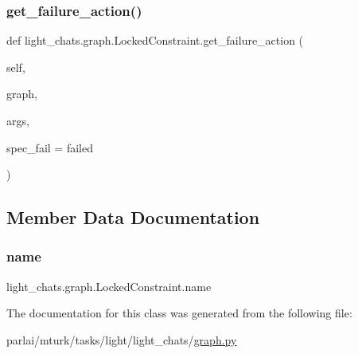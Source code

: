 \subsubsection{\texorpdfstring{get\+\_\+failure\+\_\+action()}{get\_failure\_action()}}
{\footnotesize\ttfamily def light\+\_\+chats.\+graph.\+Locked\+Constraint.\+get\+\_\+failure\+\_\+action (\begin{DoxyParamCaption}\item[{}]{self,  }\item[{}]{graph,  }\item[{}]{args,  }\item[{}]{spec\+\_\+fail = {\ttfamily \textquotesingle{}failed\textquotesingle{}} }\end{DoxyParamCaption})}



\subsection{Member Data Documentation}
\mbox{\label{classlight__chats_1_1graph_1_1LockedConstraint_a3eb1d8b9659eb4aceae729d6a7e2d9f4}} 
\subsubsection{\texorpdfstring{name}{name}}
{\footnotesize\ttfamily light\+\_\+chats.\+graph.\+Locked\+Constraint.\+name\hspace{0.3cm}{\ttfamily [static]}}



The documentation for this class was generated from the following file\+:\begin{DoxyCompactItemize}
\item 
parlai/mturk/tasks/light/light\+\_\+chats/\hyperlink{parlai_2mturk_2tasks_2light_2light__chats_2graph_8py}{graph.\+py}\end{DoxyCompactItemize}
